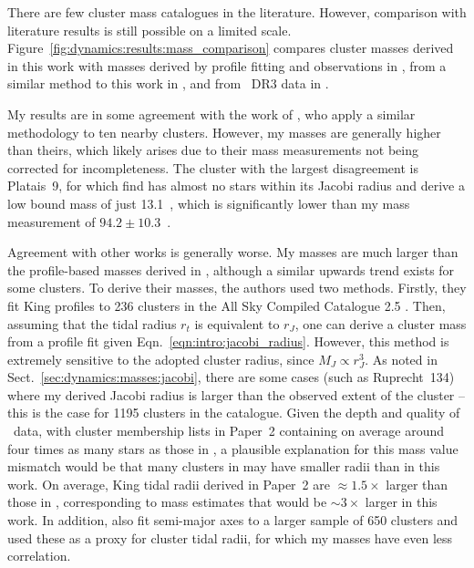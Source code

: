 There are few cluster mass catalogues in the literature. However, comparison with literature results is still possible on a limited scale. Figure~\ref{fig:dynamics:results:mass_comparison} compares cluster masses derived in this work with masses derived by profile fitting and observations in \cite{piskunov_tidal_2008}, from a similar method to this work in \cite{meingast_extended_2021}, and from \gaia\ DR3 data in \cite{cordoni_photometric_binaries_2023}. 

My results are in some agreement with the work of \cite{meingast_extended_2021}, who apply a similar methodology to ten nearby clusters. However, my masses are generally higher than theirs, which likely arises due to their mass measurements not being corrected for incompleteness. The cluster with the largest disagreement is Platais~9, for which \cite{meingast_extended_2021} find has almost no stars within its Jacobi radius and derive a low bound mass of just 13.1~\MSun, which is significantly lower than my mass measurement of $94.2 \pm 10.3$~\MSun.

Agreement with other works is generally worse. My masses are much larger than the profile-based masses derived in \cite{piskunov_tidal_2008}, although a similar upwards trend exists for some clusters. To derive their masses, the authors used two methods. Firstly, they fit King profiles to 236 clusters in the All Sky Compiled Catalogue 2.5 \cite{kharchenko_allsky_compiled_2001}. Then, assuming that the \cite{king_structure_star_1962} tidal radius $r_t$ is equivalent to $r_J$, one can derive a cluster mass from a profile fit given Eqn.~\ref{eqn:intro:jacobi_radius}. However, this method is extremely sensitive to the adopted cluster radius, since $M_J \propto r_J^3$. As noted in Sect.~\ref{sec:dynamics:masses:jacobi}, there are some cases (such as Ruprecht~134) where my derived Jacobi radius is larger than the observed extent of the cluster -- this is the case for 1195 clusters in the catalogue. Given the depth and quality of \gaia\ data, with cluster membership lists in Paper~2 containing on average around four times as many stars as those in \cite{kharchenko_global_2013}, a plausible explanation for this mass value mismatch would be that many clusters in \cite{piskunov_tidal_2008} may have smaller radii than in this work. On average, King tidal radii derived in Paper~2 are $\approx 1.5\times$ larger than those in \cite{piskunov_tidal_2008}, corresponding to mass estimates that would be $\sim 3\times$ larger in this work. In addition, \cite{piskunov_tidal_2008} also fit semi-major axes to a larger sample of 650 clusters and used these as a proxy for cluster tidal radii, for which my masses have even less correlation.

